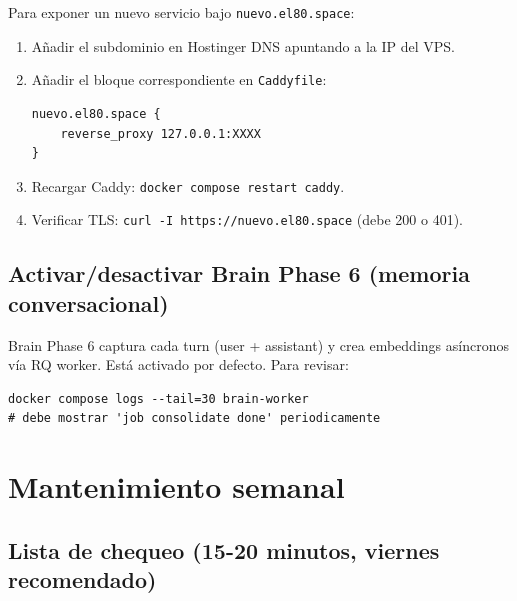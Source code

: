 \documentclass[11pt,a4paper]{article}
\begin{document}
Para exponer un nuevo servicio bajo \texttt{nuevo.el80.space}:

\begin{enumerate}[leftmargin=*,itemsep=1pt]
\item Añadir el subdominio en Hostinger DNS apuntando a la IP del VPS.
\item Añadir el bloque correspondiente en \texttt{Caddyfile}:
\begin{lstlisting}[language=bashx]
nuevo.el80.space {
    reverse_proxy 127.0.0.1:XXXX
}
\end{lstlisting}
\item Recargar Caddy: \texttt{docker compose restart caddy}.
\item Verificar TLS: \texttt{curl -I https://nuevo.el80.space} (debe 200 o 401).
\end{enumerate}

\subsection{Activar/desactivar Brain Phase 6 (memoria conversacional)}

Brain Phase 6 captura cada turn (user + assistant) y crea embeddings asíncronos vía RQ worker. Está activado por defecto. Para revisar:

\begin{lstlisting}[language=bashx]
docker compose logs --tail=30 brain-worker
# debe mostrar 'job consolidate done' periodicamente
\end{lstlisting}

\newpage

\section{Mantenimiento semanal}

\subsection{Lista de chequeo (15-20 minutos, viernes recomendado)}
\end{document}
